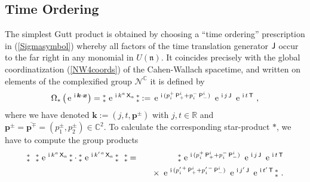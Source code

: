 \documentclass[11pt,a4paper]{article}
\newcommand{\NOa}{\mbox{$\substack{\ast\\\ast}$}}       %
\newcommand{\mbf}[1]{{\boldsymbol {#1} }}
\def\ii{{\,{\rm i}\,}}
\def\P{{\sf P}}
\def\T{{\sf T}}
\def\X{{\sf X}}
\def\J{{\sf J}}
\def\mx{{\mbf x}}
\def\mk{{\mbf k}}
\def\mbp{{\mbf p}}
\def\mfn{{\mathfrak n}}
\newcommand{\complex}{{\mathbb C}} %
\newcommand{\real}{{\mathbb R}} %
\def\e{{\,\rm e}\,}
\def\bea{\begin{eqnarray}}
\def\eea{\end{eqnarray}}
\begin{document}
\subsection{Time Ordering\label{TOP}}

The simplest Gutt product is obtained by choosing a ``time ordering''
prescription in (\ref{Sigmasymbol}) whereby all factors of the time
translation generator $\J$ occur to the far right in any monomial in
$U(\mfn)$. It coincides precisely with the global coordinatization
(\ref{NW4coords}) of the Cahen-Wallach spacetime, and written on
elements of the complexified group
$\mathcal{N}^\complex$ it is defined by
\begin{equation}
  \label{eq:time:defn}
\Omega_*\left(\e^{\ii\mk\cdot\mx}\right)=
\NOa\,\e^{\ii k^a\,\X_a}\,\NOa:=\e^{\ii(p_i^+\,\P^i_+
+p_i^-\,\P^i_-)}~\e^{\ii j\,\J}~\e^{\ii t\,\T} \ ,
\end{equation}
where we have denoted
$\mk:=(j,t,\mbp^\pm)$ with $j,t\in\real$ and
$\mbp^\pm=\overline{\mbp^\mp}=(p_1^\pm,p_2^\pm)\in\complex^2$. To
calculate the corresponding star-product $*$, we have to compute the
group products
\bea
\NOa~~\NOa\,\e^{\ii k^a\,\X_a}\,\NOa\cdot\NOa\,\e^{\ii k^{\prime\,a}\,\X_a}
\,\NOa~~\NOa&=&\NOa\,\e^{\ii(p_i^+\,\P^i_++p_i^-\,\P^i_-)}~\e^{\ii j\,\J}~
\e^{\ii t\,\T}\nonumber\\ && \quad\times~
\e^{\ii(p_i^{\prime\,+}\,\P^i_++p_i^{\prime\,-}\,\P^i_-)}~\e^{\ii j'\,\J}~
\e^{\ii t'\,\T}\,\NOa \ .
\label{TOgpprods}\eea
\end{document}
